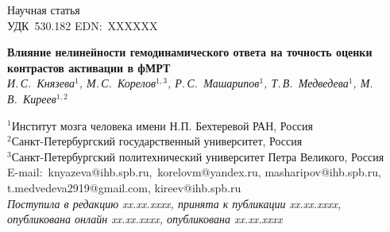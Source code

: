 \documentclass[11pt,twoside,a4paper]{article}
\let\Letter\undefined
\newcommand{\published}{xx.xx.xxxx} 		%
\renewcommand{\EDN}{EDN:~XXXXXX}
\renewcommand{\received}{xx.xx.xxxx} 		%
\renewcommand{\accepted}{xx.xx.xxxx} 		%
\renewcommand{\onlinepublished}{xx.xx.xxxx} %
\renewcommand{\titpaper}{Влияние нелинейности гемодинамического ответа на точность оценки контрастов активации в фМРТ}
\begin{document}
\label{firstpage}
\thispagestyle{firststyle}


\infojournal
\vspace*{.1cm}

{\small \noindent
	Научная статья\hfill \doi\\ 
	УДК~530.182  \hfill \EDN
}
\vspace*{.1cm}


\begin{center}\textbf{\large \titpaper}\\[0.4\baselineskip]

\emph{И.\,С.~Князева$^{1}$, М.\,С.~Корелов$^{1,3}$, Р.\,С.~Машарипов$^{1}$, Т.\,В.~Медведева$^{1}$, М.\,В.~Киреев$^{1,2}$}\vspace{.3\baselineskip}

\footnotesize{
	$^{1}$Институт мозга человека имени Н.П. Бехтеревой РАН, Россия\\
	$^{2}$Санкт-Петербургский государственный университет, Россия\\
    $^{3}$Санкт-Петербургский политехнический университет Петра Великого, Россия\\
	E-mail: \Letter\,knyazeva@ihb.spb.ru, \Letter\,korelovm@yandex.ru, masharipov@ihb.spb.ru, t.medvedeva2919@gmail.com, kireev@ihb.spb.ru\\[1pt]
		\emph{Поступила в редакцию   \received, принята к публикации \accepted, \\  опубликована онлайн \onlinepublished, опубликована \published}
	}
\end{center}
\end{document}
